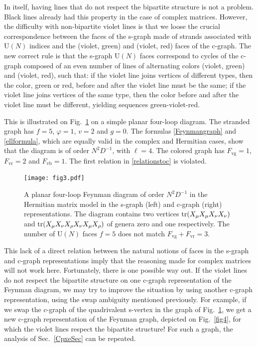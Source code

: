\documentclass[12pt]{article}
\numberwithin{equation}{section}
\begin{document}
In itself, having lines that do not respect the bipartite structure is not a problem. Black lines already had this property in the case of complex matrices. However, the difficulty with non-bipartite violet lines is that we loose the crucial correspondence between the faces of the s-graph made of strands associated with $\text{U}(N)$ indices and the (violet, green) and (violet, red) faces of the c-graph. The new correct rule is that the s-graph $\text{U}(N)$ faces correspond to cycles of the c-graph composed of an even number of lines of alternating colors (violet, green) and (violet, red), such that: if the violet line joins vertices of different types, then the color, green or red, before and after the violet line must be the same; if the violet line joins vertices of the same type, then the color before and after the violet line must be different, yielding sequences green-violet-red.

This is illustrated on Fig.\ \ref{fig3} on a simple planar four-loop diagram. The stranded graph has $f=5$, $\varphi=1$, $v=2$ and $g=0$. The formulas \eqref{Feynmangraph} and \eqref{ellformula}, which are equally valid in the complex and Hermitian cases, show that the diagram is of order $N^{2}D^{-1}$, with $\ell=4$. The colored graph has $F_{\text{vg}}=1$, $F_{\text{vr}}=2$ and $F_{\text{vb}}=1$. The first relation in \eqref{relationstoc} is violated. 

%
\begin{figure}
\centerline{\texttt{[image: fig3.pdf]}}
\caption{A planar four-loop Feynman diagram of order $N^{2}D^{-1}$ in the Hermitian matrix model in the s-graph (left) and c-graph (right) representations. The diagram contains two vertices $\mathop{\rm tr}\nolimits (X_{\mu}X_{\mu}X_{\nu}X_{\nu})$ and $\mathop{\rm tr}\nolimits (X_{\mu}X_{\nu}X_{\rho}X_{\nu}X_{\mu}X_{\rho})$ of genera zero and one respectively. The number of $\text{U}(N)$ faces $f=5$ does not match $F_{\text{vg}}+F_{\text{vr}}=3$.\label{fig3}}
\end{figure}
%

This lack of a direct relation between the natural notions of faces in the s-graph and c-graph representations imply that the reasoning made for complex matrices will not work here. Fortunately, there is one possible way out. If the violet lines do not respect the bipartite structure on one c-graph representation of the Feynman diagram, we may try to improve the situation by using another c-graph representation, using the swap ambiguity mentioned previously. For example, if we swap the c-graph of the quadrivalent s-vertex in the graph of Fig.\ \ref{fig3}, we get a new c-graph representation of the Feynman graph, depicted on Fig.\ \ref{fig4}, for which the violet lines respect the bipartite structure! For such a graph, the analysis of Sec.\ \ref{CpxeSec} can be repeated.
\end{document}
